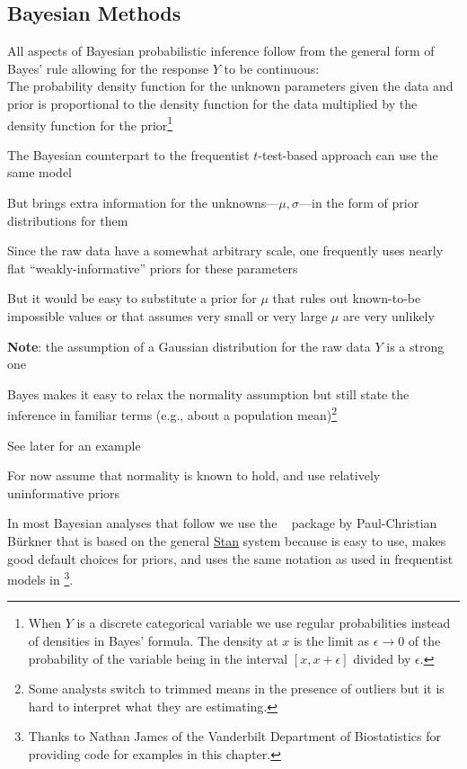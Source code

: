 \subsection{Bayesian Methods}
\bi
\item All aspects of Bayesian probabilistic inference follow from the
  general form of Bayes' rule allowing for the response $Y$ to be
  continuous:\\The probability density function for the unknown
  parameters given the data and prior is proportional to the density
  function for the data multiplied by the density function for the
  prior\footnote{When $Y$ is a discrete categorical variable we use
    regular probabilities instead of densities in Bayes' formula.  The
 density at $x$ is the 
    limit as $\epsilon \rightarrow 0$ of the probability of the
    variable being in the interval $[x, x + \epsilon]$ divided by  $\epsilon$.}
\item The Bayesian counterpart to the frequentist $t$-test-based
  approach can use the same model
\item But brings extra information for the unknowns---$\mu,
  \sigma$---in the form of prior distributions for them
\item Since the raw data have a somewhat arbitrary scale, one
  frequently uses nearly flat ``weakly-informative'' priors for these parameters
  \bi
  \item But it would be easy to substitute a prior for $\mu$ that
    rules out known-to-be impossible values or that assumes very small
    or very large $\mu$ are very unlikely
  \ei
\item \textbf{Note}: the assumption of a Gaussian distribution for the
  raw data $Y$ is a strong one
  \bi
  \item Bayes makes it easy to relax the normality assumption but still
    state the inference in familiar terms (e.g., about a population
    mean)\footnote{Some analysts switch to trimmed means in the
      presence of outliers but it is hard to interpret what they are
      estimating.}
  \item See later for an example
  \ei
\item For now assume that normality is known to hold, and use
  relatively uninformative priors
\ei

In most Bayesian analyses that follow we use the \R\
   package by Paul-Christian Bürkner that is based on the
  general \href{http://mc-stan.org}{Stan} system because \co{brms} is easy to
  use, makes good default choices for priors,  and uses the same
  notation as used in frequentist models in \R\footnote{Thanks to
    Nathan James of the Vanderbilt Department of Biostatistics for
    providing \co{brms} code for examples in this chapter.}.
  
